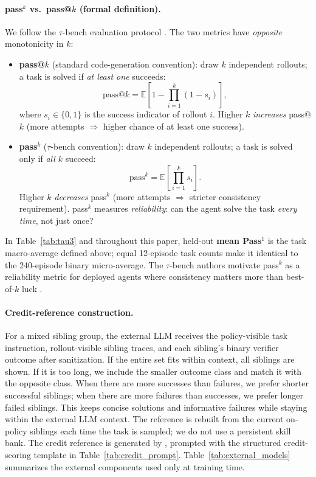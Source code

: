 \paragraph{pass$^k$ vs.\ pass@$k$ (formal definition).}
We follow the $\tau$-bench evaluation protocol \citep{taubench2024}. The two
metrics have \emph{opposite} monotonicity in $k$:
\begin{itemize}
  \item \textbf{pass@$k$} (standard code-generation convention): draw $k$
    independent rollouts; a task is solved if \emph{at least one} succeeds:
    \[
      \mathrm{pass@}k = \mathbb{E}\!\left[
        1 - \prod_{i=1}^{k}(1-s_i)
      \right],
    \]
    where $s_i\in\{0,1\}$ is the success indicator of rollout $i$. Higher $k$
    \emph{increases} pass@$k$ (more attempts $\Rightarrow$ higher chance of
    at least one success).
  \item \textbf{pass$^k$} ($\tau$-bench convention): draw $k$ independent
    rollouts; a task is solved only if \emph{all $k$} succeed:
    \[
      \mathrm{pass}^k = \mathbb{E}\!\left[
        \prod_{i=1}^{k} s_i
      \right].
    \]
    Higher $k$ \emph{decreases} pass$^k$ (more attempts $\Rightarrow$ stricter
    consistency requirement). pass$^k$ measures \emph{reliability}: can the
    agent solve the task \emph{every time}, not just once?
\end{itemize}
In Table~\ref{tab:tau3} and throughout this paper, held-out \textbf{mean
Pass$^1$} is the task macro-average defined above; equal 12-episode task counts
make it identical to the 240-episode binary micro-average. The $\tau$-bench authors
motivate pass$^k$ as a
reliability metric for deployed agents where consistency matters more than
best-of-$k$ luck \citep{taubench2024}.

\paragraph{Credit-reference construction.} For a mixed sibling group, the
external LLM receives the policy-visible task instruction, rollout-visible
sibling traces, and each sibling's binary verifier outcome after sanitization. If
the entire set fits within context, all siblings are shown. If it is too long,
we include the smaller outcome class and match it with the opposite class. When
there are more successes than failures, we prefer shorter successful siblings;
when there are more failures than successes, we prefer longer failed siblings.
This keeps concise solutions and informative failures while staying within the
external LLM context. The reference is rebuilt from the current on-policy
siblings each time the task is sampled; we do not use a persistent skill bank.
The credit reference is generated by \creditreferenceproviderphrase{}, prompted with the
structured credit-scoring template in Table~\ref{tab:credit_prompt}.
Table~\ref{tab:external_models} summarizes the external components used only at
training time.

